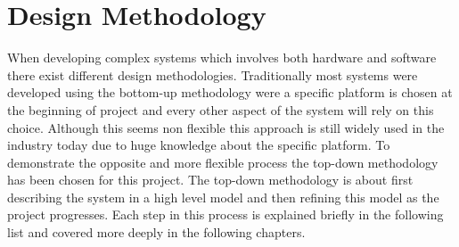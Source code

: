 \chapter{Design Methodology}

When developing complex systems which involves both hardware and software there exist different design methodologies. Traditionally most systems were developed using the bottom-up methodology were a specific platform is chosen at the beginning of project and every other aspect of the system will rely on this choice. Although this seems non flexible this approach is still widely used in the industry today due to huge knowledge about the specific platform.
To demonstrate the opposite and more flexible process the top-down methodology has been chosen for this project. The top-down methodology is about first describing the system in a high level model and then refining this model as the project progresses.
Each step in this process is explained briefly in the following list and covered more deeply in the following chapters.


